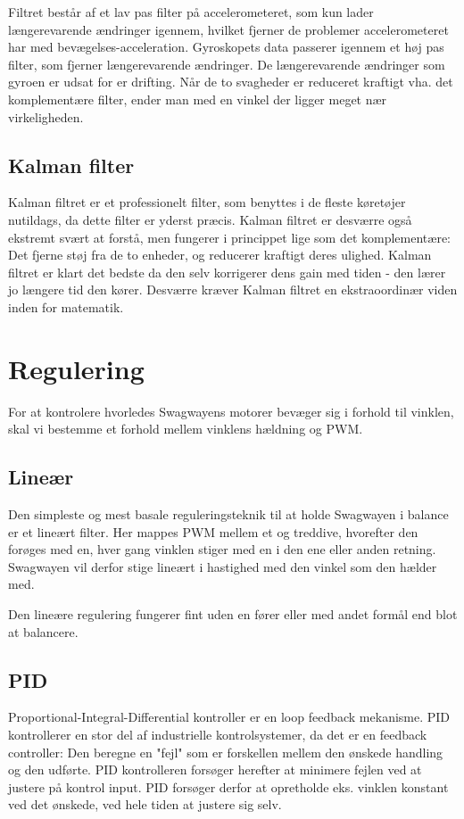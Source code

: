 \documentclass[a4paper,11pt,oneside,article,danish,table]{memoir}
\begin{document}
Filtret består af et lav pas filter på accelerometeret, som kun lader længerevarende ændringer igennem, hvilket fjerner de problemer accelerometeret har med bevægelses-acceleration. Gyroskopets data passerer igennem et høj pas filter, som fjerner længerevarende ændringer. De længerevarende ændringer som gyroen er udsat for er drifting. Når de to svagheder er reduceret kraftigt vha. det komplementære filter, ender man med en vinkel der ligger meget nær virkeligheden.
\subsection{Kalman filter}
Kalman filtret er et professionelt filter, som benyttes i de fleste køretøjer nutildags, da dette filter er yderst præcis. Kalman filtret er desværre også ekstremt svært at forstå, men fungerer i princippet lige som det komplementære: Det fjerne støj fra de to enheder, og reducerer kraftigt deres ulighed. Kalman filtret er klart det bedste da den selv korrigerer dens gain med tiden - den lærer jo længere tid den kører. Desværre kræver Kalman filtret en ekstraoordinær viden inden for matematik.

\section{Regulering}\label{sec:regulering}
For at kontrolere hvorledes Swagwayens motorer bevæger sig i forhold til vinklen, skal vi bestemme et forhold mellem vinklens hældning og PWM. 
\subsection{Lineær}
Den simpleste og mest basale reguleringsteknik til at holde Swagwayen i balance er et lineært filter. Her mappes PWM mellem et og treddive, hvorefter den forøges med en, hver gang vinklen stiger med en i den ene eller anden retning. Swagwayen vil derfor stige lineært i hastighed med den vinkel som den hælder med.

Den lineære regulering fungerer fint uden en fører eller med andet formål end blot at balancere.
\subsection{PID}
Proportional-Integral-Differential kontroller er en loop feedback mekanisme. PID kontrollerer en stor del af industrielle kontrolsystemer, da det er en feedback controller: Den beregne en "fejl" som er forskellen mellem den ønskede handling og den udførte. PID kontrolleren forsøger herefter at minimere fejlen ved at justere på kontrol input. PID forsøger derfor at opretholde eks. vinklen konstant ved det ønskede, ved hele tiden at justere sig selv. 
\end{document}
